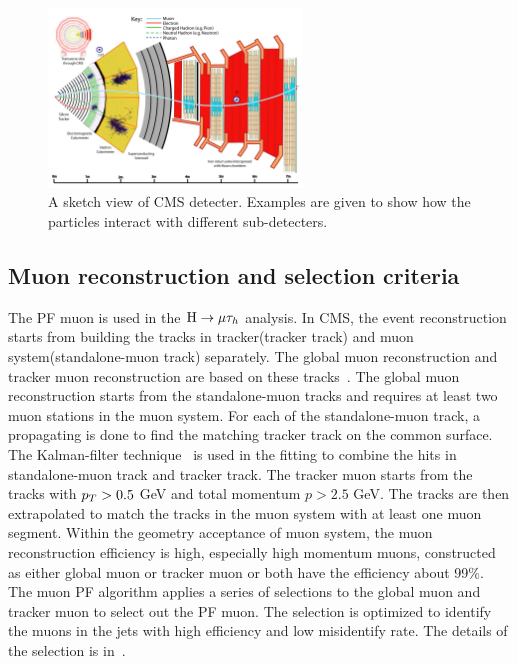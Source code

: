 \begin{figure}[htbp] 
\centering
\includegraphics[width=0.6\textwidth]{chapter4/CMS_detecter_slice.pdf}
\caption{A sketch view of CMS detecter. Examples are given to show how the particles interact with different sub-detecters.}
\label{fig:CMSslice}
\end{figure}



\subsection{Muon reconstruction and selection criteria}

The PF muon is used in the $\mathrm{H}\to \mu\tau_{h}$ analysis. In CMS, the event reconstruction starts from building the tracks in tracker(tracker track) and muon system(standalone-muon track) separately. The global muon reconstruction and tracker muon reconstruction are based on these tracks~\cite{muonreco}. The global muon reconstruction starts from the standalone-muon tracks and requires at least two muon stations in the muon system. For each of the standalone-muon track, a propagating is done to find the matching tracker track on the common surface. The Kalman-filter technique~\cite{Fruhwirth:1987fm} is used in the fitting to combine the hits in standalone-muon track and tracker track. The tracker muon starts from the tracks with $p_{T}>0.5$ GeV and total momentum $p>2.5$ GeV. The tracks are then extrapolated to match the tracks in the muon system with at least one muon segment.  Within the geometry acceptance of muon system, the muon reconstruction efficiency is high, especially high momentum muons, constructed as either global muon or tracker muon or both have the  efficiency about 99\%. The muon PF algorithm applies a series of selections to the global muon and tracker muon to select out the PF muon. The selection is optimized to identify the muons in the jets with high efficiency and low misidentify rate. The details of the selection is in~\cite{PFmuonselection}.   



